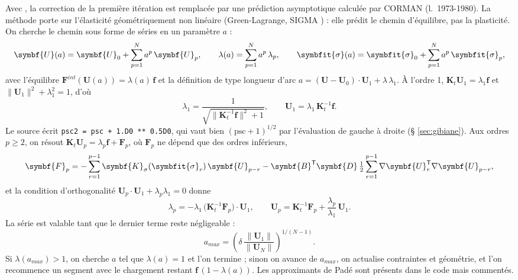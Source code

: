 \documentclass[11pt,a4paper]{article}
\numberwithin{equation}{section}
\newcommand{\src}[1]{\texttt{\detokenize{#1}}}          %
\newcommand{\pr}[1]{\textsf{#1}}                        %
\newcommand{\op}[1]{\textsf{\small #1}}                 %
\newcommand{\lig}[1]{l.~#1}
\newcommand{\vc}[1]{\symbf{#1}}                         %
\newcommand{\sig}{\symbfit{\sigma}}
\begin{document}
Avec \src{MAN}, la correction de la première itération est remplacée par une prédiction asymptotique calculée par \pr{CORMAN} (\lig{1973-1980}).
La méthode porte sur l'élasticité géométriquement non linéaire (Green-Lagrange, \op{SIGMA} \src{'LINE'}) : elle prédit le chemin d'équilibre, pas la plasticité.
On cherche le chemin sous forme de séries en un paramètre $a$ :
\begin{equation}
\vc U(a) = \vc U_0 + \sum_{p=1}^{N} a^p\,\vc U_p,\qquad \lambda(a) = \sum_{p=1}^{N} a^p\,\lambda_p,\qquad \sig(a) = \sig_0 + \sum_{p=1}^{N} a^p\,\sig_p,
\end{equation}
avec l'équilibre $\vc F^{int}(\vc U(a)) = \lambda(a)\,\vc f$ et la définition de type longueur d'arc $a = (\vc U - \vc U_0)\cdot\vc U_1 + \lambda\,\lambda_1$.
À l'ordre 1, $\vc K_t\vc U_1 = \lambda_1\vc f$ et $\lVert\vc U_1\rVert^2 + \lambda_1^2 = 1$, d'où
\begin{equation}
\lambda_1 = \frac1{\sqrt{\lVert\vc K_t^{-1}\vc f\rVert^2 + 1}},\qquad \vc U_1 = \lambda_1\,\vc K_t^{-1}\vc f .
\end{equation}
Le source écrit \texttt{psc2 = psc + 1.D0 ** 0.5D0}, qui vaut bien $(\mathrm{psc} + 1)^{1/2}$ par l'évaluation de gauche à droite (§ \ref{sec:gibiane}).
Aux ordres $p \ge 2$, on résout $\vc K_t\vc U_p = \lambda_p\vc f + \vc F_p$, où $\vc F_p$ ne dépend que des ordres inférieurs,
\begin{equation}
\vc F_p = -\sum_{r=1}^{p-1}\vc K_\sigma(\sig_r)\,\vc U_{p-r} - \vc B^{\mathsf T}\vc D\,\tfrac12\sum_{r=1}^{p-1}\nabla\vc U_r^{\mathsf T}\nabla\vc U_{p-r},
\end{equation}
et la condition d'orthogonalité $\vc U_p\cdot\vc U_1 + \lambda_p\lambda_1 = 0$ donne
\begin{equation}
\lambda_p = -\lambda_1\,\big(\vc K_t^{-1}\vc F_p\big)\cdot\vc U_1,\qquad \vc U_p = \vc K_t^{-1}\vc F_p + \frac{\lambda_p}{\lambda_1}\,\vc U_1 .
\end{equation}
La série est valable tant que le dernier terme reste négligeable :
\begin{equation}
a_{max} = \left(\delta\,\frac{\lVert\vc U_1\rVert}{\lVert\vc U_N\rVert}\right)^{1/(N-1)} .
\end{equation}
Si $\lambda(a_{max}) > 1$, on cherche $a$ tel que $\lambda(a) = 1$ et l'on termine ; sinon on avance de $a_{max}$, on actualise contraintes et géométrie, et l'on recommence un segment avec le chargement restant $\vc f\,(1 - \lambda(a))$.
Les approximants de Padé sont présents dans le code mais commentés.
\end{document}
